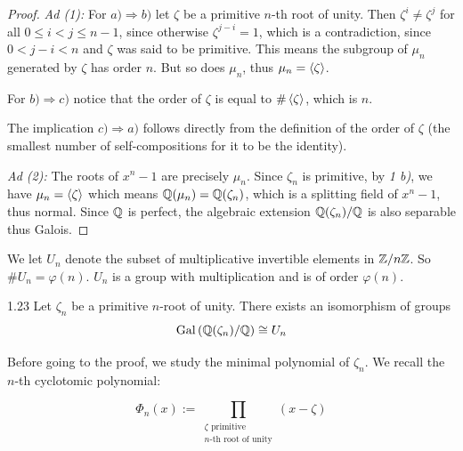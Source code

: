 \documentclass[twoside = false,	%
		headsepline,		%
		parskip = true,
		]{scrbook}						%
\begin{document}
        \begin{proof}
            
            \textit{Ad (1):}
            For $a) \Rightarrow b)$ let $\zeta$ be a primitive $n$-th root of unity. Then $\zeta^i \neq \zeta^j$ for all $0 \leq i < j \leq n-1$, since otherwise $\zeta^{j - i} = 1$, which is a contradiction, since $0 < j - i < n$ and $\zeta$ was said to be primitive. This means the subgroup of $\mu_n$ generated by $\zeta$ has order $n$. But so does $\mu_n$, thus $\mu_n = \left\langle \zeta\right\rangle$.
            
            For $b) \Rightarrow c)$ notice that the order of $\zeta$ is equal to $\#\left\langle \zeta\right\rangle$, which is $n$.
            
            The implication $c) \Rightarrow a)$ follows directly from the definition of the order of $\zeta$ (the smallest number of self-compositions for it to be the identity).
            
            \textit{Ad (2):}
            The roots of $x^n - 1$ are precisely $\mu_n$. Since $\zeta_n$ is primitive, by \textit{1 b)}, we have $\mu_n = \left\langle \zeta\right\rangle$ which means $\mathbb Q(\mu_n) = \mathbb Q(\zeta_n)$, which is a splitting field of $x^n - 1$, thus normal. Since $\mathbb Q$ is perfect, the algebraic extension $\mathbb Q(\zeta_n)/\mathbb Q$ is also separable thus Galois.
            
        \end{proof}
        
        We let $U_n$ denote the subset of multiplicative invertible elements in $\mathbb Z/n\mathbb Z$. So $\# U_n = \varphi(n)$. $U_n$ is a group with multiplication and is of order $\varphi(n)$.
        
        \begin{proposition}{}{1.23}
            Let $\zeta_n$ be a primitive $n$-root of unity. There exists an isomorphism of groups
            \begin{equation*}
                \mathrm{Gal}\left( \mathbb Q(\zeta_n)/\mathbb Q\right) \cong U_n
            \end{equation*}
        \end{proposition}
        
        Before going to the proof, we study the minimal polynomial of $\zeta_n$. We recall the $n$-th cyclotomic polynomial:
        
        \begin{equation*}
            \Phi_n(x) := \prod_{ \substack{\zeta \text{ primitive } \\
            n \text{-th root of unity}}
            } (x-\zeta) 
        \end{equation*}
        
\end{document}
